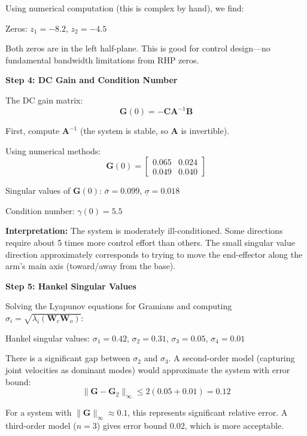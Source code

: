 Using numerical computation (this is complex by hand), we find:

Zeros: $z_1 = -8.2$, $z_2 = -4.5$

Both zeros are in the left half-plane. This is good for control design---no fundamental bandwidth limitations from RHP zeros.

\textbf{Step 4: DC Gain and Condition Number}

The DC gain matrix:
\begin{equation}
\mathbf{G}(0) = -\mathbf{C}\mathbf{A}^{-1}\mathbf{B}
\end{equation}

First, compute $\mathbf{A}^{-1}$ (the system is stable, so $\mathbf{A}$ is invertible).

Using numerical methods:
\begin{equation}
\mathbf{G}(0) = \begin{bmatrix} 0.065 & 0.024 \\ 0.049 & 0.040 \end{bmatrix}
\end{equation}

Singular values of $\mathbf{G}(0)$: $\bar{\sigma} = 0.099$, $\underline{\sigma} = 0.018$

Condition number: $\gamma(0) = 5.5$

\textbf{Interpretation:} The system is moderately ill-conditioned. Some directions require about 5 times more control effort than others. The small singular value direction approximately corresponds to trying to move the end-effector along the arm's main axis (toward/away from the base).

\textbf{Step 5: Hankel Singular Values}

Solving the Lyapunov equations for Gramians and computing $\sigma_i = \sqrt{\lambda_i(\mathbf{W}_c\mathbf{W}_o)}$:

Hankel singular values: $\sigma_1 = 0.42$, $\sigma_2 = 0.31$, $\sigma_3 = 0.05$, $\sigma_4 = 0.01$

There is a significant gap between $\sigma_2$ and $\sigma_3$. A second-order model (capturing joint velocities as dominant modes) would approximate the system with error bound:
\begin{equation}
\|\mathbf{G} - \mathbf{G}_2\|_\infty \leq 2(0.05 + 0.01) = 0.12
\end{equation}

For a system with $\|\mathbf{G}\|_\infty \approx 0.1$, this represents significant relative error. A third-order model ($n=3$) gives error bound $0.02$, which is more acceptable.


